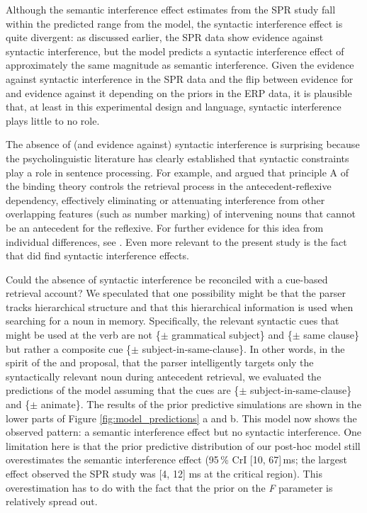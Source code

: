 \documentclass[a4paper, man, floatsintext]{apa7}
\begin{document}
Although the semantic interference effect estimates from the SPR study fall within the predicted range from the model, the syntactic interference effect is quite divergent: as discussed earlier, the SPR data show evidence against syntactic interference, but the model predicts a syntactic interference effect of approximately the same magnitude as semantic interference. Given the evidence against syntactic interference in the SPR data and the flip between evidence for and evidence against it depending on the priors in the ERP data, it is plausible that, at least in this experimental design and language, syntactic interference plays little to no role. 

The absence of (and evidence against) syntactic interference is surprising because the psycholinguistic literature has clearly established that syntactic constraints play a role in sentence processing. For example, \textcite{dillon2013} and \textcite{Sturt2003} argued that principle A of the binding theory controls the retrieval process in the antecedent-reflexive dependency, effectively eliminating or attenuating interference from other overlapping features (such as number marking) of intervening nouns that cannot be an antecedent for the reflexive. For further evidence for this idea from individual differences, see \textcite{yadav2021individual}. Even more relevant to the present study is the fact that \textcite{mertzen} did find syntactic interference effects. 

Could the absence of syntactic interference be reconciled with a cue-based retrieval account? We speculated that one possibility might be that the parser tracks hierarchical structure and that this hierarchical information is used when searching for a noun in memory. Specifically, the relevant syntactic cues that might be used at the verb are not  \{$\pm$ grammatical subject\} and \{$\pm$ same clause\} but rather a composite cue \{$\pm$ subject-in-same-clause\}. In other words, in the spirit of the  \textcite{dillon2013} and \textcite{Sturt2003} proposal, that the parser intelligently targets only the syntactically relevant noun during antecedent retrieval, we evaluated the predictions of the model assuming that the cues are \{$\pm$ subject-in-same-clause\} and \{$\pm$ animate\}. The results of the prior predictive simulations are shown in the lower parts of Figure \ref{fig:model_predictions} a and b. This model now shows the observed pattern: a semantic interference effect but no syntactic interference. One limitation here is that the prior predictive distribution of our post-hoc  model still overestimates the semantic interference effect (95\,\% CrI [10, 67]\,ms; the largest effect observed the SPR study was [4, 12] ms at the critical region). This overestimation has to do with the fact that the prior on the \textit{F} parameter is relatively spread out. 
\end{document}

